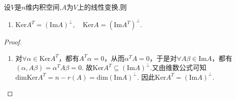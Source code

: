 \documentclass[../../main.tex]{subfiles}
\begin{document}
\begin{proposition}\label{proposition:一些常见的正交补空间}
设$V$是$n$维内积空间,$A$为$V$上的线性变换,则
\begin{enumerate}
\item $\mathrm{Ker}A^T=\left( \mathrm{Im}A \right) ^{\bot} ,\quad\mathrm{Ker}A=\left( \mathrm{Im}A^T \right) ^{\bot}.$

\end{enumerate}
\end{proposition}
\begin{proof}
\begin{enumerate}
\item 对$\forall \alpha \in \mathrm{Ker}A^T$，都有$A^T\alpha =0$，从而$\alpha ^TA=0$，于是对$\forall A\beta \in \mathrm{Im}A$，都有
$\left( \alpha ,A\beta \right) =\alpha ^TA\beta =0.$
故$\mathrm{Ker}A^T\subseteq \left( \mathrm{Im}A \right) ^{\bot}$.又由维数公式可知
$\mathrm{dimKer}A^T=n-r\left( A \right) =\mathrm{dim}\left( \mathrm{Im}A \right) ^{\bot}.$
因此$\mathrm{Ker}A^T=\left( \mathrm{Im}A \right) ^{\bot}.$

\end{enumerate}

\end{proof}
\end{document}
